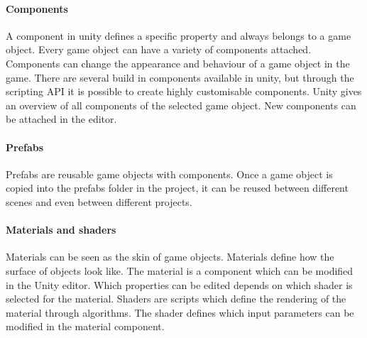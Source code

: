 \paragraph{Components} A component in unity defines a specific property and always belongs to a game object. Every game object can have a variety of components attached. Components can change the appearance and behaviour of a game object in the game. There are several build in components available in unity, but through the scripting API it is possible to create highly customisable components. Unity gives an overview of all components of the selected game object. New components can be attached in the editor.
\paragraph{Prefabs} Prefabs are reusable game objects with components. Once a game object is copied into the prefabs folder in the project, it can be reused between different scenes and even between different projects.
\paragraph{Materials and shaders} Materials can be seen as the skin of game objects. Materials define how the surface of objects look like. The material is a component which can be modified in the Unity editor. Which properties can be edited depends on which shader is selected for the material. Shaders are scripts which define the rendering of the material through algorithms. The shader defines which input parameters can be modified in the material component.

